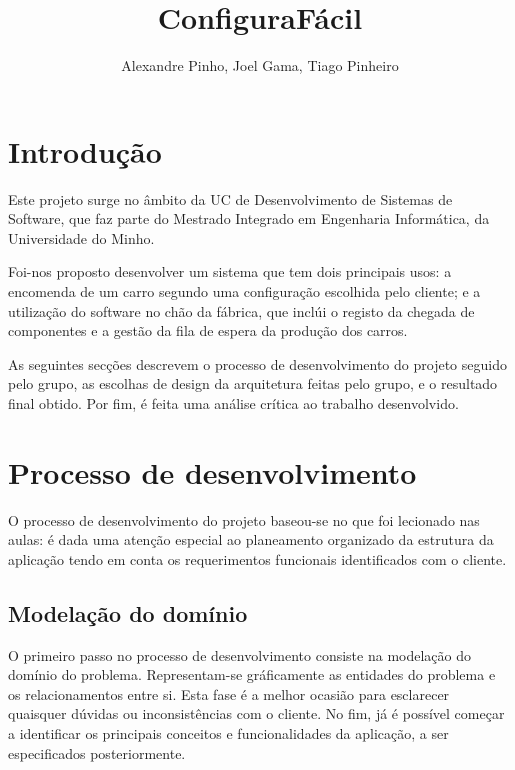 \documentclass{llncs}
\begin{document}
\title{ConfiguraFácil}
\author{Alexandre Pinho, Joel Gama, Tiago Pinheiro}


\maketitle

\clearpage

\section{Introdução}

Este projeto surge no âmbito da UC de Desenvolvimento de Sistemas de Software, que faz parte do Mestrado Integrado em Engenharia Informática, da Universidade do Minho.

Foi-nos proposto desenvolver um sistema que tem dois principais usos: a encomenda de um carro segundo uma configuração escolhida pelo cliente; e a utilização do software no chão da fábrica, que inclúi o registo da chegada de componentes e a gestão da fila de espera da produção dos carros. 

As seguintes secções descrevem o processo de desenvolvimento do projeto seguido pelo grupo, as escolhas de design da arquitetura feitas pelo grupo, e o resultado final obtido. Por fim, é feita uma análise crítica ao trabalho desenvolvido.

\clearpage
\section{Processo de desenvolvimento}

O processo de desenvolvimento do projeto baseou-se no que foi lecionado nas aulas: é dada uma atenção especial ao planeamento organizado da estrutura da aplicação tendo em conta os requerimentos funcionais identificados com o cliente.

\subsection{Modelação do domínio}

O primeiro passo no processo de desenvolvimento consiste na modelação do domínio do problema. Representam-se gráficamente as entidades do problema e os relacionamentos entre si. Esta fase é a melhor ocasião para esclarecer quaisquer dúvidas ou inconsistências com o cliente. No fim, já é possível começar a identificar os principais conceitos e funcionalidades da aplicação, a ser especificados posteriormente.
\end{document}
